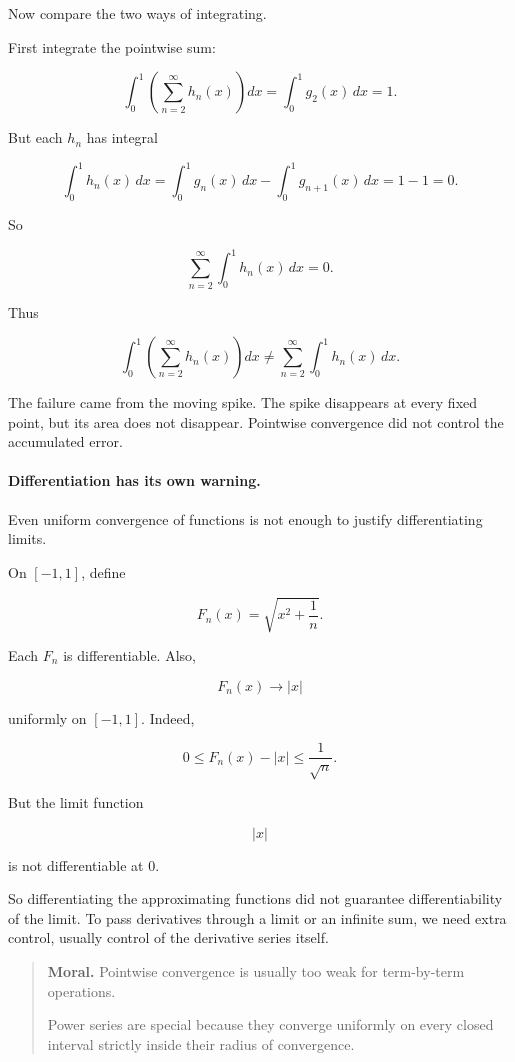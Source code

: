 Now compare the two ways of integrating.

First integrate the pointwise sum:

\[
\int_0^1 \left(\sum_{n=2}^{\infty}h_n(x)\right)dx
=
\int_0^1 g_2(x)\,dx
=
1.
\]

But each \(h_n\) has integral

\[
\int_0^1 h_n(x)\,dx
=
\int_0^1 g_n(x)\,dx-\int_0^1 g_{n+1}(x)\,dx
=
1-1
=
0.
\]

So

\[
\sum_{n=2}^{\infty}\int_0^1 h_n(x)\,dx
=
0.
\]

Thus

\[
\boxed{
\int_0^1 \left(\sum_{n=2}^{\infty}h_n(x)\right)dx
\neq
\sum_{n=2}^{\infty}\int_0^1 h_n(x)\,dx.
}
\]

The failure came from the moving spike.  The spike disappears at every fixed point, but
its area does not disappear.  Pointwise convergence did not control the accumulated
error.

\paragraph{Differentiation has its own warning.}
Even uniform convergence of functions is not enough to justify differentiating limits.

On \([-1,1]\), define

\[
F_n(x)=\sqrt{x^2+\frac1n}.
\]

Each \(F_n\) is differentiable.  Also,

\[
F_n(x)\to |x|
\]

uniformly on \([-1,1]\).  Indeed,

\[
0\le F_n(x)-|x|
\le \frac1{\sqrt n}.
\]

But the limit function

\[
|x|
\]

is not differentiable at \(0\).

So differentiating the approximating functions did not guarantee differentiability of the
limit.  To pass derivatives through a limit or an infinite sum, we need extra control,
usually control of the derivative series itself.

\begin{quote}
\textbf{Moral.}
Pointwise convergence is usually too weak for term-by-term operations.

Power series are special because they converge uniformly on every closed interval
strictly inside their radius of convergence.
\end{quote}


